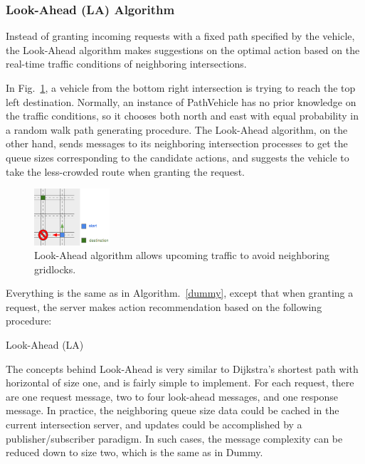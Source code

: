 \documentclass[conference]{IEEEtran}
\begin{document}
\subsubsection{ Look-Ahead (LA) Algorithm}

Instead of granting incoming requests with a fixed path specified by the vehicle, the Look-Ahead algorithm makes suggestions on the optimal action based on the real-time traffic conditions of neighboring intersections. 

In Fig.~\ref{la_example}, a vehicle from the bottom right intersection is trying to reach the top left destination. Normally, an instance of PathVehicle has no prior knowledge on the traffic conditions, so it chooses both north and east with equal probability in a random walk path generating procedure. The Look-Ahead algorithm, on the other hand, sends messages to its neighboring intersection processes to get the queue sizes corresponding to the candidate actions, and suggests the vehicle to take the less-crowded route when granting the request.



\begin{figure}[h]
    \center    
    \includegraphics[width=0.25\textwidth]{images/la_example.png}
	\caption{Look-Ahead algorithm allows upcoming traffic to avoid neighboring gridlocks.}
	\label{la_example}
\end{figure}

\begin{algorithm}
  Everything is the same as in Algorithm.~\ref{dummy}, except that when granting a request, the server makes action recommendation based on the following procedure:
  
  \caption{Look-Ahead (LA) \label{look_ahead}}
\end{algorithm}

The concepts behind Look-Ahead is very similar to Dijkstra's shortest path with horizontal of size one, and is fairly simple to implement. For each request, there are one request message, two to four look-ahead messages, and one response message. In practice, the neighboring queue size data could be cached in the current intersection server, and updates could be accomplished by a publisher/subscriber paradigm. In such cases, the message complexity can be reduced down to size two, which is the same as in Dummy.
\end{document}

